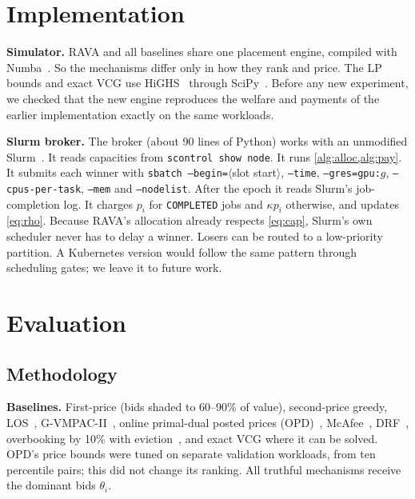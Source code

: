 \documentclass[journal]{IEEEtran}
\theoremstyle{remark}
\begin{document}
\section{Implementation}\label{sec:slurm}
\textbf{Simulator.} RAVA and all baselines share one placement engine, compiled with Numba~\cite{lam2015numba}. So the mechanisms differ only in how they rank and price. The LP bounds and exact VCG use HiGHS~\cite{huangfu2018} through SciPy~\cite{virtanen2020}. Before any new experiment, we checked that the new engine reproduces the welfare and payments of the earlier implementation exactly on the same workloads.

\textbf{Slurm broker.} The broker (about 90 lines of Python) works with an unmodified Slurm~\cite{yoo2003slurm}. It reads capacities from \texttt{scontrol show node}. It runs \cref{alg:alloc,alg:pay}. It submits each winner with \texttt{sbatch --begin=}$\langle$slot start$\rangle$, \texttt{--time}, \texttt{--gres=gpu:}$g$, \texttt{--cpus-per-task}, \texttt{--mem} and \texttt{--nodelist}. After the epoch it reads Slurm's job-completion log. It charges $p_i$ for \texttt{COMPLETED} jobs and $\kappa p_i$ otherwise, and updates \eqref{eq:rho}. Because RAVA's allocation already respects \eqref{eq:cap}, Slurm's own scheduler never has to delay a winner. Losers can be routed to a low-priority partition. A Kubernetes version would follow the same pattern through scheduling gates; we leave it to future work.

\section{Evaluation}\label{sec:eval}
\subsection{Methodology}
\textbf{Baselines.} First-price (bids shaded to 60--90\% of value), second-price greedy, LOS~\cite{lehmann2002}, G-VMPAC-II~\cite{nejad2015}, online primal-dual posted prices (OPD)~\cite{zhang2017ton,buchbinder2009}, McAfee~\cite{mcafee1992}, DRF~\cite{ghodsi2011}, overbooking by 10\% with eviction~\cite{qi2025ohtrust}, and exact VCG where it can be solved. OPD's price bounds were tuned on separate validation workloads, from ten percentile pairs; this did not change its ranking. All truthful mechanisms receive the dominant bids $\theta_i$.
\end{document}
